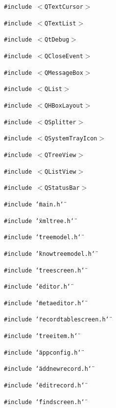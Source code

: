 {\tt \#include $<$QText\-Cursor$>$}\par
{\tt \#include $<$QText\-List$>$}\par
{\tt \#include $<$Qt\-Debug$>$}\par
{\tt \#include $<$QClose\-Event$>$}\par
{\tt \#include $<$QMessage\-Box$>$}\par
{\tt \#include $<$QList$>$}\par
{\tt \#include $<$QHBox\-Layout$>$}\par
{\tt \#include $<$QSplitter$>$}\par
{\tt \#include $<$QSystem\-Tray\-Icon$>$}\par
{\tt \#include $<$QTree\-View$>$}\par
{\tt \#include $<$QList\-View$>$}\par
{\tt \#include $<$QStatus\-Bar$>$}\par
{\tt \#include \char`\"{}main.h\char`\"{}}\par
{\tt \#include \char`\"{}xmltree.h\char`\"{}}\par
{\tt \#include \char`\"{}treemodel.h\char`\"{}}\par
{\tt \#include \char`\"{}knowtreemodel.h\char`\"{}}\par
{\tt \#include \char`\"{}treescreen.h\char`\"{}}\par
{\tt \#include \char`\"{}editor.h\char`\"{}}\par
{\tt \#include \char`\"{}metaeditor.h\char`\"{}}\par
{\tt \#include \char`\"{}recordtablescreen.h\char`\"{}}\par
{\tt \#include \char`\"{}treeitem.h\char`\"{}}\par
{\tt \#include \char`\"{}appconfig.h\char`\"{}}\par
{\tt \#include \char`\"{}addnewrecord.h\char`\"{}}\par
{\tt \#include \char`\"{}editrecord.h\char`\"{}}\par
{\tt \#include \char`\"{}findscreen.h\char`\"{}}\par


